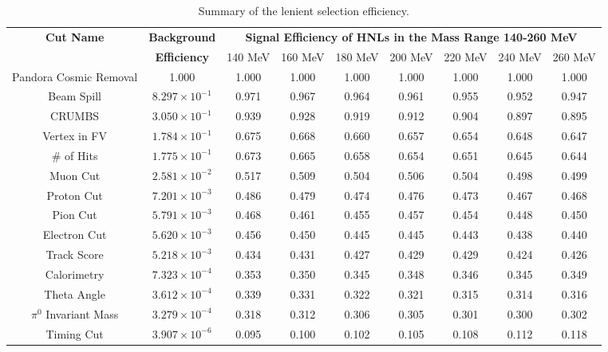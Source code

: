 \begin{landscape}
\begin{table}[htbp!]
\caption[Summary of the Lenient Selection Efficiency]{Summary of the lenient selection efficiency.}
\label{table:cut_eff_relaxed}
\centering
\begin{center}
\begin{tabular}{| c | c | c | c | c | c | c | c | c |} 
 \hline
 \textbf{Cut Name} & \textbf{Background} & \multicolumn{7}{c|}{\textbf{Signal Efficiency of HNLs in the Mass Range 140-260 MeV}}\\ [1ex]
 \cline{3-9} 
		   &  \textbf{Efficiency} & 140 MeV & 160 MeV  & 180 MeV  & 200 MeV  & 220 MeV  & 240 MeV  & 260 MeV  \\ [1ex] 
 \hline
 Pandora Cosmic Removal & 1.000  		 & 1.000 & 1.000 & 1.000 & 1.000 & 1.000 & 1.000 & 1.000 \\ [1ex] 
 Beam Spill 		& $8.297 \times 10^{-1}$ & 0.971 & 0.967 & 0.964 & 0.961 & 0.955 & 0.952 & 0.947 \\ [1ex] 
 CRUMBS 		& $3.050 \times 10^{-1}$ & 0.939 & 0.928 & 0.919 & 0.912 & 0.904 & 0.897 & 0.895 \\ [1ex] 
 Vertex in FV 		& $1.784 \times 10^{-1}$ & 0.675 & 0.668 & 0.660 & 0.657 & 0.654 & 0.648 & 0.647 \\ [1ex]
 \# of Hits 		& $1.775 \times 10^{-1}$ & 0.673 & 0.665 & 0.658 & 0.654 & 0.651 & 0.645 & 0.644 \\ [1ex]
 Muon Cut 		& $2.581 \times 10^{-2}$ & 0.517 & 0.509 & 0.504 & 0.506 & 0.504 & 0.498 & 0.499 \\ [1ex]
 Proton Cut 		& $7.201 \times 10^{-3}$ & 0.486 & 0.479 & 0.474 & 0.476 & 0.473 & 0.467 & 0.468 \\ [1ex]
 Pion Cut 		& $5.791 \times 10^{-3}$ & 0.468 & 0.461 & 0.455 & 0.457 & 0.454 & 0.448 & 0.450 \\ [1ex]
 Electron Cut 		& $5.620 \times 10^{-3}$ & 0.456 & 0.450 & 0.445 & 0.445 & 0.443 & 0.438 & 0.440 \\ [1ex]
 Track Score 		& $5.218 \times 10^{-3}$ & 0.434 & 0.431 & 0.427 & 0.429 & 0.429 & 0.424 & 0.426 \\ [1ex]
 Calorimetry 		& $7.323 \times 10^{-4}$ & 0.353 & 0.350 & 0.345 & 0.348 & 0.346 & 0.345 & 0.349 \\ [1ex]
 Theta Angle 		& $3.612 \times 10^{-4}$ & 0.339 & 0.331 & 0.322 & 0.321 & 0.315 & 0.314 & 0.316 \\ [1ex]
 $\pi^0$ Invariant Mass & $3.279 \times 10^{-4}$ & 0.318 & 0.312 & 0.306 & 0.305 & 0.301 & 0.300 & 0.302 \\ [1ex]
 Timing Cut  		& $3.907 \times 10^{-6}$ & 0.095 & 0.100 & 0.102 & 0.105 & 0.108 & 0.112 & 0.118 \\ [1ex]
 \hline
\end{tabular}
\end{center}
\end{table}
\end{landscape}

